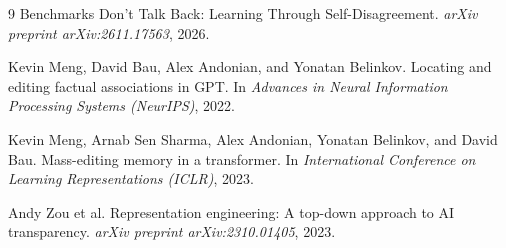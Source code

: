 \documentclass[10pt,twocolumn]{article}
\begin{document}
\begin{thebibliography}{9}
\footnotesize
{}
Benchmarks Don't Talk Back: Learning Through Self-Disagreement. \emph{arXiv preprint arXiv:2611.17563}, 2026.

Kevin Meng, David Bau, Alex Andonian, and Yonatan Belinkov. Locating and editing factual associations in GPT. In \emph{Advances in Neural Information Processing Systems (NeurIPS)}, 2022.

Kevin Meng, Arnab Sen Sharma, Alex Andonian, Yonatan Belinkov, and David Bau. Mass-editing memory in a transformer. In \emph{International Conference on Learning Representations (ICLR)}, 2023.

Andy Zou et al. Representation engineering: A top-down approach to AI transparency. \emph{arXiv preprint arXiv:2310.01405}, 2023.
\end{thebibliography}
\end{document}
